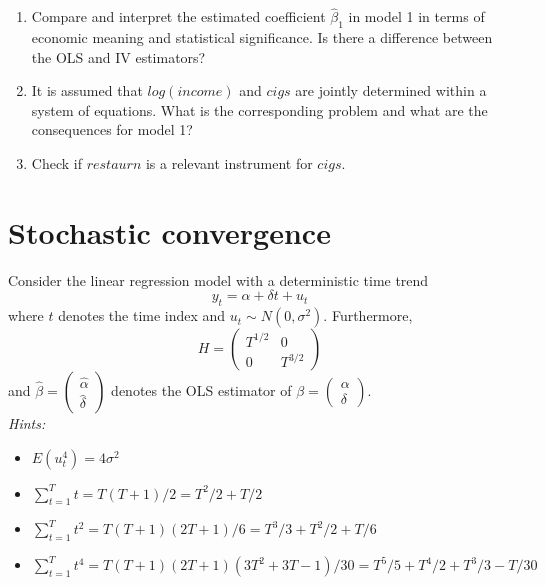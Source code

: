 \documentclass{article}
\begin{document}
\begin{enumerate}[label=(\alph*)]
	\item Compare and interpret the estimated coefficient $\hat{\beta}_1$ in model 1 in terms of economic meaning and statistical significance. Is there a difference between the OLS and IV estimators?
	
	\item It is assumed that $log(income)$ and $cigs$ are jointly determined within a system of equations. What is the corresponding problem and what are the consequences for model 1?
	\item Check if $restaurn$ is a relevant instrument for $cigs$.

\end{enumerate}
\newpage


\section{Stochastic convergence}
Consider the linear regression model with a deterministic time trend
$$y_t = \alpha + \delta t + u_t$$
where $t$ denotes the time index and $u_t \sim N(0,\sigma^2)$. Furthermore, $$H = \begin{pmatrix} T^{1/2} & 0\\0 & T^{3/2} \end{pmatrix}$$
and $\hat{\beta} =\begin{pmatrix} \hat{\alpha} \\ \hat{\delta}\end{pmatrix}$ denotes the OLS estimator of $\beta =\begin{pmatrix} \alpha \\ \delta\end{pmatrix}$.\\
\textsl{Hints:}
\begin{itemize}
	\item $E(u_t^4) = 4 \sigma^2$
	\item $\sum_{t=1}^T t = T(T+1)/2 = T^2/2 + T/2$
	\item $\sum_{t=1}^T t^2 = T(T+1)(2T+1)/6 = T^3/3 + T^2/2 + T/6$
	\item $\sum_{t=1}^T t^4 = T(T+1)(2T+1)(3T^2+3T-1)/30 = T^5/5 + T^4/2 + T^3/3 -T/30$
\end{itemize}
\end{document}
